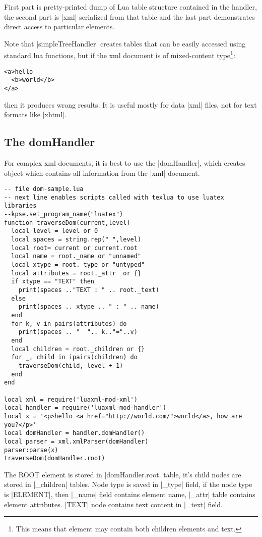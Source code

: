 \documentclass{ltxdoc}
\begin{document}
First part is pretty-printed dump of Lua table structure contained in the handler, the second
part is |xml| serialized from that table and the last part demonstrates direct access to particular
elements.

Note that |simpleTreeHandler| creates tables that can be easily accessed using
standard lua functions, but if the xml document is of mixed-content type\footnote{%
This means that element may contain both children elements and text.}:

\begin{verbatim}
<a>hello
  <b>world</b>
</a>	  
\end{verbatim}

\noindent then it produces wrong results. It is useful mostly for data |xml| files, not for
text formats like |xhtml|.

\subsection{The domHandler}

For complex xml documents, it is best to use the |domHandler|, which creates object which contains all information
from the |xml| document. 

\begin{verbatim}
-- file dom-sample.lua
-- next line enables scripts called with texlua to use luatex libraries
--kpse.set_program_name("luatex")
function traverseDom(current,level)
  local level = level or 0
  local spaces = string.rep(" ",level)
  local root= current or current.root
  local name = root._name or "unnamed"
  local xtype = root._type or "untyped"
  local attributes = root._attr  or {} 
  if xtype == "TEXT" then 
    print(spaces .."TEXT : " .. root._text)
  else	 
    print(spaces .. xtype .. " : " .. name) 
  end
  for k, v in pairs(attributes) do
    print(spaces .. "  ".. k.."="..v)
  end
  local children = root._children or {}
  for _, child in ipairs(children) do
    traverseDom(child, level + 1)
  end
end

local xml = require('luaxml-mod-xml')
local handler = require('luaxml-mod-handler')
local x = '<p>hello <a href="http://world.com/">world</a>, how are you?</p>'
local domHandler = handler.domHandler()
local parser = xml.xmlParser(domHandler)
parser:parse(x)
traverseDom(domHandler.root)
\end{verbatim}

The ROOT element is stored in |domHandler.root| table, it's child nodes are stored in |_children|
tables. Node type is saved in |_type| field, if the node type is |ELEMENT|, then |_name| field contains 
element name, |_attr| table contains element attributes. |TEXT| node contains text content in |_text| 
field.
\end{document}
